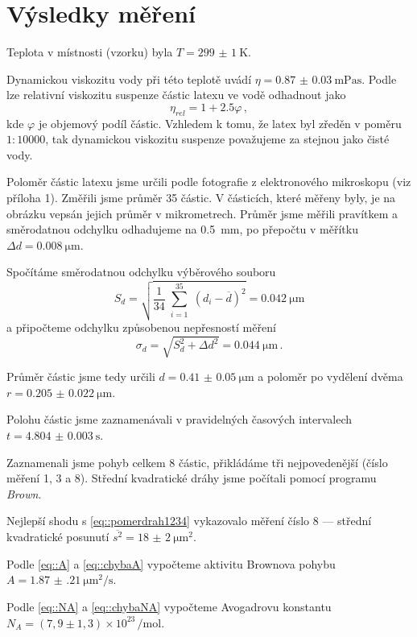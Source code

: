 \section*{Výsledky měření}
Teplota v místnosti (vzorku) byla $T =\SI{299(1)}{\kelvin}$.

Dynamickou viskozitu vody při této teplotě uvádí \cite{viskozita} $\eta=\SI{0.87(3)}{\milli\pascal\s}$.
Podle \cite{skripta} lze relativní viskozitu suspenze částic latexu ve vodě odhadnout jako
\begin{equation}
\eta _{rel} = 1 + \num{2.5}\varphi \,,
\end{equation}
kde $\varphi$ je objemový podíl částic.
Vzhledem k tomu, že latex byl zředěn v poměru $1:\num{10000}$, tak dynamickou viskozitu suspenze považujeme za stejnou jako čisté vody.

Poloměr částic latexu jsme určili podle fotografie z elektronového mikroskopu (viz příloha 1).
Změřili jsme průměr \num{35} částic.
V částicích, které měřeny byly, je na obrázku vepsán jejich průměr v mikrometrech. 
Průměr jsme měřili pravítkem a směrodatnou odchylku odhadujeme na \SI{0.5}{\mm}, po přepočtu v měřítku $\Delta d =\SI{0.008}{\micro\metre}$.

Spočítáme směrodatnou odchylku výběrového souboru
\begin{equation}
S_d=\sqrt{  \frac{1}{34} \sum_{\substack{i=1}}^{35} (d_i - \overline{d})^2} = \SI{0.042}{\micro\metre}
\end{equation}
a připočteme odchylku způsobenou nepřesností měření
\begin{equation}
\sigma_d=\sqrt{  S_d^2 + \Delta d^2}=\SI{0.044}{\micro\metre} \,.
\end{equation}

Průměr částic jsme tedy určili $d=\SI{0.41(5)}{\micro\metre}$ a poloměr po vydělení dvěma $r=\SI{0.205(22)}{\micro\metre}$.

Polohu částic jsme zaznamenávali v pravidelných časových intervalech $t=\SI{4.804(3)}{\s}$.

Zaznamenali jsme pohyb celkem \num{8} částic, přikládáme tři nejpovedenější (číslo měření 1, 3 a 8).
Střední kvadratické dráhy jsme počítali pomocí programu \emph{Brown}.

Nejlepší shodu s \eqref{eq::pomerdrah1234} vykazovalo měření číslo 8 --- střední kvadratické posunutí $\overline{s^2}=\SI{18(2)}{\micro\metre\squared}$.

Podle \eqref{eq::A} a \eqref{eq::chybaA} vypočteme aktivitu Brownova pohybu $A=\SI{1.87(21)}{\micro\metre\squared\per\s}$.

Podle \eqref{eq::NA} a \eqref{eq::chybaNA} vypočteme Avogadrovu konstantu $N_A=(7,9 \pm 1,3) \times 10^{23} \,\si{\per\mole}$.